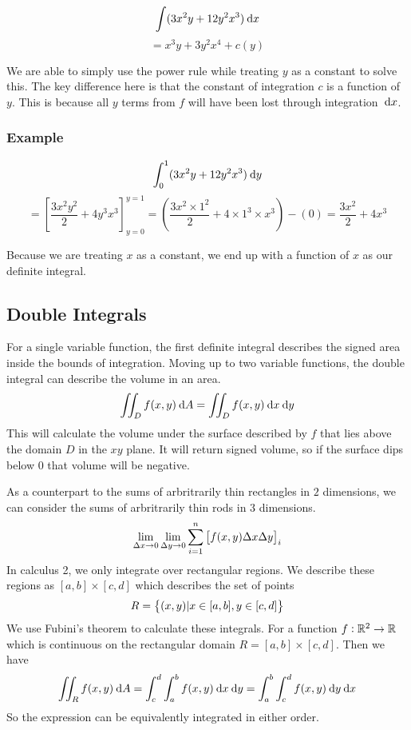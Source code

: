\documentclass[12pt]{report}
\begin{document}
\begin{flushleft}
\[\int (3x^2y + 12y^2x^3) \:\mathrm{d}x\]
\[= x^3y + 3y^2x^4 + c(y)\]

We are able to simply use the power rule while treating \(y\) as a constant to
solve this. The key difference here is that the constant of integration \(c\)
is a function of \(y\). This is because all \(y\) terms from \(f\) will have
been lost through integration \(\:\mathrm{d}x\).

\subsubsection*{Example}

\[\int_0^1 (3x^2y + 12y^2x^3) \:\mathrm{d}y\]
\[= \left[\frac{3x^2y^2}{2} + 4y^3x^3\right]_{y = 0}^{y = 1}
= \left(\frac{3x^2\times1^2}{2} + 4\times1^3\times x^3\right) - (0)
= \frac{3x^2}{2} + 4x^3\]

Because we are treating \(x\) as a constant, we end up with a function of \(x\)
as our definite integral.

\subsection*{Double Integrals}

For a single variable function, the first definite integral describes the
signed area inside the bounds of integration. Moving up to two variable
functions, the double integral can describe the volume in an area.
\[\iint_D f(x, y) \:\mathrm{d}A = \iint_D f(x, y) \:\mathrm{d}x\:\mathrm{d}y\]
This will calculate the volume under the surface described by \(f\) that lies
above the domain \(D\) in the \(xy\) plane. It will return signed volume, so if
the surface dips below \(0\) that volume will be negative. \par
As a counterpart to the sums of arbritrarily thin rectangles in \(2\)
dimensions, we can consider the sums of arbritrarily thin rods in \(3\)
dimensions.
\[\lim\limits_{\Delta x \rightarrow 0}\lim\limits_{\Delta y \rightarrow 0}
\sum_{i = 1}^n \left[f(x, y)\Delta x\Delta y\right]_i\]
In calculus 2, we only integrate over rectangular regions. We describe these
regions as \([a, b]\times[c, d]\) which describes the set of points
\[R = \set{(x, y) | x \in [a, b], y \in [c, d]}\]
We use Fubini's theorem to calculate these integrals. For a function
\(f: \mathbb{R}^2 \rightarrow \mathbb{R}\) which is continuous on the rectangular domain
\(R = [a, b]\times[c, d]\). Then we have
\[\iint_R f(x, y) \:\mathrm{d}A = \int_c^d\int_a^b f(x, y)\:\mathrm{d}x\:\mathrm{d}y
= \int_a^b\int_c^d f(x, y)\:\mathrm{d}y\:\mathrm{d}x\]
So the expression can be equivalently integrated in either order.


\end{flushleft}
\end{document}
